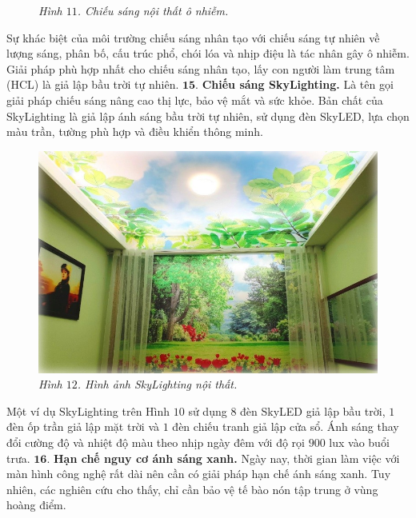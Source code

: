 \begin{multicols}{2}
\begin{figure}[H]
		\caption{\small\textit{\color{timhieukhoahoc}Hình $11$. Chiếu sáng nội thất ô nhiễm.}}
		\vspace*{-10pt}
	\end{figure}
	Sự khác biệt của môi trường chiếu sáng nhân tạo với chiếu sáng tự nhiên về lượng sáng, phân bố, cấu trúc phổ, chói lóa và nhịp điệu là tác nhân gây ô nhiễm. Giải pháp phù hợp nhất cho chiếu sáng nhân tạo, lấy con người làm trung tâm (HCL) là giả lập bầu trời tự nhiên.   
	\vskip 0.1cm
	$\pmb{15.}$ \textbf{\color{timhieukhoahoc}Chiếu sáng SkyLighting.} 
	\vskip 0.1cm
	Là tên gọi giải pháp chiếu sáng nâng cao thị lực, bảo vệ mắt và sức khỏe.
	Bản chất của SkyLighting là giả lập ánh sáng bầu trời tự nhiên, sử dụng đèn SkyLED, lựa chọn màu trần, tường phù hợp và điều khiển thông minh. 
	\begin{figure}[H]
		\vspace*{-5pt}
		\centering
		\captionsetup{labelformat= empty, justification=centering}
		\includegraphics[width= 1\linewidth]{12}
		\caption{\small\textit{\color{timhieukhoahoc}Hình $12$. Hình ảnh SkyLighting nội thất.}}
		\vspace*{-10pt}
	\end{figure}
	Một ví dụ SkyLighting trên Hình $10$ sử dụng $8$ đèn SkyLED giả lập bầu trời, $1$ đèn ốp trần giả lập mặt trời và $1$ đèn chiếu tranh giả lập cửa sổ. Ánh sáng thay đổi cường độ và nhiệt độ màu theo nhịp ngày đêm với độ rọi $900$ lux vào buổi trưa. 
	\vskip 0.1cm
	$\pmb{16.}$ \textbf{\color{timhieukhoahoc}Hạn chế nguy cơ ánh sáng xanh.}
	\vskip 0.1cm
	\vskip 0.1cm
	Ngày nay, thời gian làm việc với màn hình công nghệ rất dài nên cần có giải pháp hạn chế ánh sáng xanh. Tuy nhiên, các nghiên cứu cho thấy, chỉ cần bảo vệ tế bào nón tập trung ở vùng hoàng điểm. 

\end{multicols}
